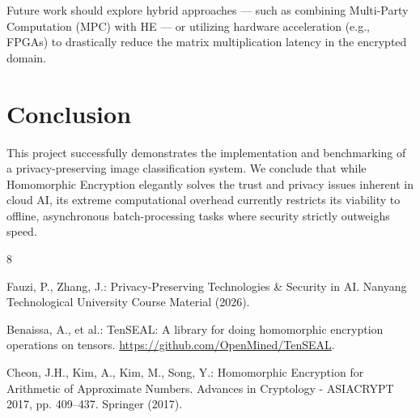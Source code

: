 \documentclass[runningheads]{llncs}
\begin{document}
Future work should explore hybrid approaches --- such as combining Multi-Party Computation (MPC) with HE --- or utilizing hardware acceleration (e.g., FPGAs) to drastically reduce the matrix multiplication latency in the encrypted domain.

\section{Conclusion}
This project successfully demonstrates the implementation and benchmarking of a privacy-preserving image classification system. We conclude that while Homomorphic Encryption elegantly solves the trust and privacy issues inherent in cloud AI, its extreme computational overhead currently restricts its viability to offline, asynchronous batch-processing tasks where security strictly outweighs speed.


\begin{thebibliography}{8}

Fauzi, P., Zhang, J.: Privacy-Preserving Technologies \& Security in AI. Nanyang Technological University Course Material (2026).

Benaissa, A., et al.: TenSEAL: A library for doing homomorphic encryption operations on tensors. \url{https://github.com/OpenMined/TenSEAL}.

Cheon, J.H., Kim, A., Kim, M., Song, Y.: Homomorphic Encryption for Arithmetic of Approximate Numbers. Advances in Cryptology - ASIACRYPT 2017, pp. 409--437. Springer (2017).

\end{thebibliography}
\end{document}
